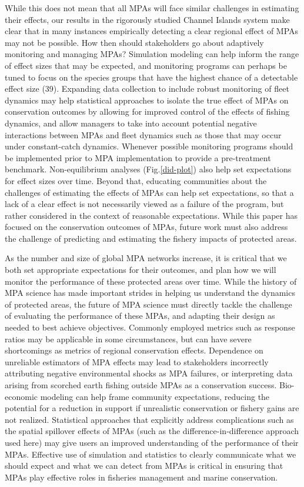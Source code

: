 \documentclass[9pt,twocolumn,twoside,lineno]{pnas-new}
\begin{document}
While this does not mean that all MPAs will face similar challenges in
estimating their effects, our results in the rigorously studied Channel
Islands system make clear that in many instances empirically detecting a
clear regional effect of MPAs may not be possible. How then should
stakeholders go about adaptively monitoring and managing MPAs?
Simulation modeling can help inform the range of effect sizes that may
be expected, and monitoring programs can perhaps be tuned to focus on
the species groups that have the highest chance of a detectable effect
size (39). Expanding data collection to include robust monitoring of
fleet dynamics may help statistical approaches to isolate the true
effect of MPAs on conservation outcomes by allowing for improved control
of the effects of fishing dynamics, and allow managers to take into
account potential negative interactions between MPAs and fleet dynamics
such as those that may occur under constant-catch dynamics. Whenever
possible monitoring programs should be implemented prior to MPA
implementation to provide a pre-treatment benchmark. Non-equilibrium
analyses (Fig.\ref{did-plot}) also help set expectations for effect
sizes over time. Beyond that, educating communities about the challenges
of estimating the effects of MPAs can help set expectations, so that a
lack of a clear effect is not necessarily viewed as a failure of the
program, but rather considered in the context of reasonable
expectations. While this paper has focused on the conservation outcomes
of MPAs, future work must also address the challenge of predicting and
estimating the fishery impacts of protected areas.

As the number and size of global MPA networks increase, it is critical
that we both set appropriate expectations for their outcomes, and plan
how we will monitor the performance of these protected areas over time.
While the history of MPA science has made important strides in helping
us understand the dynamics of protected areas, the future of MPA science
must directly tackle the challenge of evaluating the performance of
these MPAs, and adapting their design as needed to best achieve
objectives. Commonly employed metrics such as response ratios may be
applicable in some circumstances, but can have severe shortcomings as
metrics of regional conservation effects. Dependence on unreliable
estimators of MPA effects may lead to stakeholders incorrectly
attributing negative environmental shocks as MPA failures, or
interpreting data arising from scorched earth fishing outside MPAs as a
conservation success. Bio-economic modeling can help frame community
expectations, reducing the potential for a reduction in support if
unrealistic conservation or fishery gains are not realized. Statistical
approaches that explicitly address complications such as the spatial
spillover effects of MPAs (such as the difference-in-difference approach
used here) may give users an improved understanding of the performance
of their MPAs. Effective use of simulation and statistics to clearly
communicate what we should expect and what we can detect from MPAs is
critical in ensuring that MPAs play effective roles in fisheries
management and marine conservation.
\end{document}

